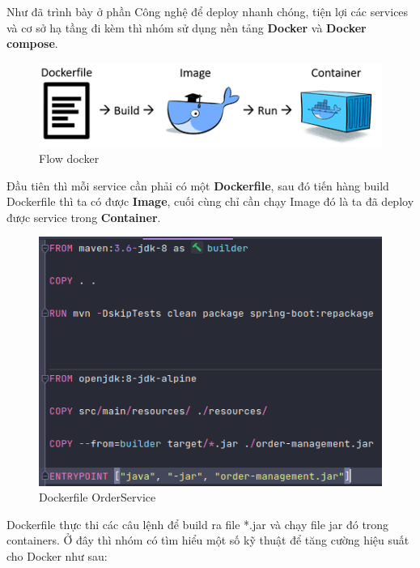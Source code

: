 		  Như đã trình bày ở phần Công nghệ để deploy nhanh chóng, tiện lợi các services và cơ sở hạ tầng đi kèm thì nhóm sử dụng nền tảng \textbf{Docker} và \textbf{Docker compose}.
		  
		  
		  \begin{figure}[H]
		  	\centering
		  	\includegraphics[width=0.8\linewidth]{Images/flowDocker}
		  	\linebreak
		  	\caption{Flow docker}
		  \end{figure}
		  
		  Đầu tiên thì mỗi service cần phải có một \textbf{Dockerfile}, sau đó tiến hàng build Dockerfile thì ta có được \textbf{Image}, cuối cùng chỉ cần chạy Image đó là ta đã deploy được service trong \textbf{Container}.
		  
		  \begin{figure}[H]
		  	\centering
		  	\includegraphics[width=0.7\linewidth]{Images/DockerfileOrderService}
		  	\linebreak
		  	\caption{Dockerfile OrderService}
		  \end{figure}
		  
		  Dockerfile thực thi các câu lệnh để build ra file *.jar và chạy file jar đó trong containers. Ở đây thì nhóm có tìm hiểu một số kỹ thuật để tăng cường hiệu suất cho Docker như sau:
		  
